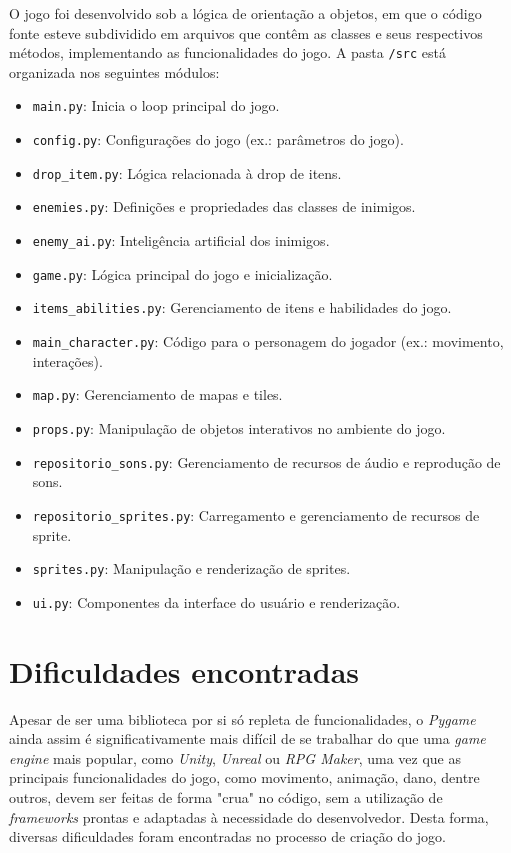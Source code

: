 \documentclass[a4paper,12pt]{article}
\begin{document}
O jogo foi desenvolvido sob a lógica de orientação a objetos, em que o código fonte esteve subdividido em arquivos que contêm as classes e seus respectivos métodos, implementando as funcionalidades do jogo. A pasta \texttt{/src} está organizada nos seguintes módulos:

\begin{itemize}
    \item \texttt{main.py}: Inicia o loop principal do jogo.
    \item \texttt{config.py}: Configurações do jogo (ex.: parâmetros do jogo).
    \item \texttt{drop\_item.py}: Lógica relacionada à drop de itens.
    \item \texttt{enemies.py}: Definições e propriedades das classes de inimigos.
    \item \texttt{enemy\_ai.py}: Inteligência artificial dos inimigos.
    \item \texttt{game.py}: Lógica principal do jogo e inicialização.
    \item \texttt{items\_abilities.py}: Gerenciamento de itens e habilidades do jogo.
    \item \texttt{main\_character.py}: Código para o personagem do jogador (ex.: movimento, interações).
    \item \texttt{map.py}: Gerenciamento de mapas e tiles.
    \item \texttt{props.py}: Manipulação de objetos interativos no ambiente do jogo.
    \item \texttt{repositorio\_sons.py}: Gerenciamento de recursos de áudio e reprodução de sons.
    \item \texttt{repositorio\_sprites.py}: Carregamento e gerenciamento de recursos de sprite.
    \item \texttt{sprites.py}: Manipulação e renderização de sprites.
    \item \texttt{ui.py}: Componentes da interface do usuário e renderização.
\end{itemize}


\section{Dificuldades encontradas}

Apesar de ser uma biblioteca por si só repleta de funcionalidades, o \textit{Pygame} ainda assim é significativamente mais difícil de se trabalhar do que uma \textit{game engine} mais popular, como \textit{Unity}, \textit{Unreal} ou \textit{RPG Maker}, uma vez que as principais funcionalidades do jogo, como movimento, animação, dano, dentre outros, devem ser feitas de forma "crua" \space no código, sem a utilização de \textit{frameworks} prontas e adaptadas à necessidade do desenvolvedor. Desta forma, diversas dificuldades foram encontradas no processo de criação do jogo.
\end{document}
